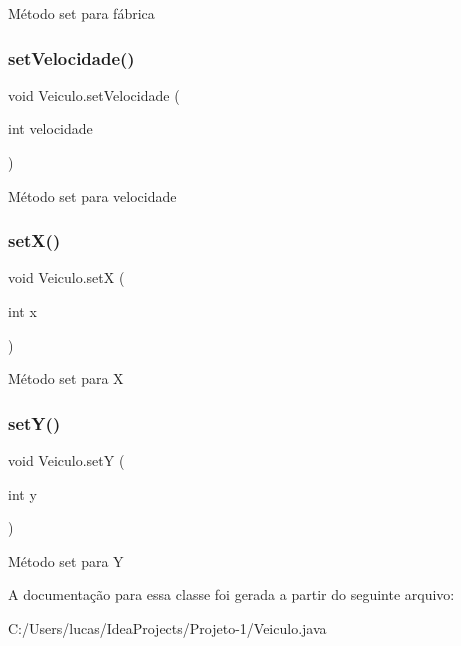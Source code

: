 Método set para fábrica \mbox{\label{class_veiculo_a45be3eedbb5c60b9f422f7a7f9f145cd}} 
\subsubsection{\texorpdfstring{set\+Velocidade()}{setVelocidade()}}
{\footnotesize\ttfamily void Veiculo.\+set\+Velocidade (\begin{DoxyParamCaption}\item[{int}]{velocidade }\end{DoxyParamCaption})}

Método set para velocidade \mbox{\label{class_veiculo_a84b2207a013e6cd869959b73a93864b8}} 
\subsubsection{\texorpdfstring{set\+X()}{setX()}}
{\footnotesize\ttfamily void Veiculo.\+setX (\begin{DoxyParamCaption}\item[{int}]{x }\end{DoxyParamCaption})}

Método set para X \mbox{\label{class_veiculo_a57cb54424b47643d8b388c72dbaf43b1}} 
\subsubsection{\texorpdfstring{set\+Y()}{setY()}}
{\footnotesize\ttfamily void Veiculo.\+setY (\begin{DoxyParamCaption}\item[{int}]{y }\end{DoxyParamCaption})}

Método set para Y 

A documentação para essa classe foi gerada a partir do seguinte arquivo\+:\begin{DoxyCompactItemize}
\item 
C\+:/\+Users/lucas/\+Idea\+Projects/\+Projeto-\/1/Veiculo.\+java\end{DoxyCompactItemize}
